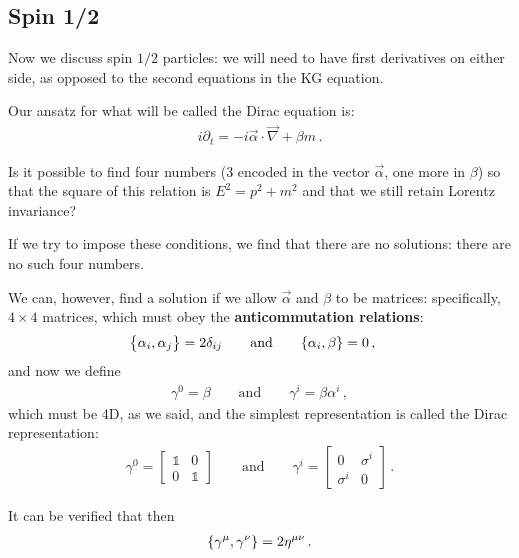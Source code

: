 \documentclass[main.tex]{subfiles}
\begin{document}
\subsection{Spin 1/2}

Now we discuss spin \(1/2\) particles: we will need to have first derivatives on either side, as opposed to the second equations in the KG equation.

Our ansatz for what will be called the Dirac equation is: 
%
\begin{align}
i \partial_{t} = - i \vec{\alpha} \cdot \vec{\nabla} + \beta m
\,.
\end{align}

Is it possible to find four numbers (3 encoded in the vector \(\vec{\alpha} \), one more in \(\beta \)) so that the square of this relation is \(E^2 = p^2+m^2\) and that we still retain Lorentz invariance? 

If we try to impose these conditions, we find that there are no solutions: there are no such four numbers. 

We can, however, find a solution if we allow \(\vec{\alpha}\) and \(\beta \) to be matrices: specifically, \(4 \times 4 \) matrices, which must obey the \textbf{anticommutation relations}: 
%
\begin{align}
\qty{\alpha_{i}, \alpha_{j}} &= 2\delta_{ij} 
\qquad \text{and} \qquad
\qty{\alpha_{i}, \beta } = 0
\,,
\end{align}
%
and now we define 
%
\begin{align}
\gamma^{0} = \beta 
\qquad \text{and} \qquad
\gamma^{i} = \beta \alpha^{i}
\,,
\end{align}
%
which must be 4D, as we said, and the simplest representation is called the Dirac representation:
%
\begin{subequations}
\begin{align}
\gamma^{0} = \left[\begin{array}{cc}
\mathbb{1} & 0 \\ 
0 & \mathbb{1}
\end{array}\right] 
\qquad \text{and} \qquad
\gamma^{i} = \left[\begin{array}{cc}
0 & \sigma^{i}   \\ 
\sigma^{i} & 0
\end{array}\right]
\,.
\end{align}
\end{subequations}

It can be verified that then 
%
\begin{align}
\qty{\gamma^{\mu }, \gamma^{\nu }} = 2 \eta^{\mu \nu }
\,.
\end{align}
\end{document}
